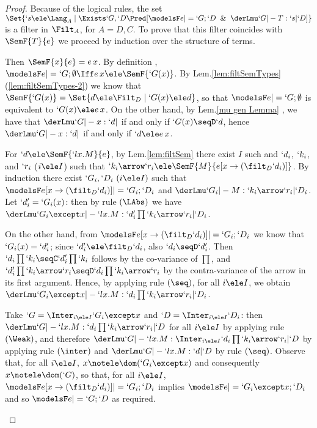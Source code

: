 \documentclass{lmcs}
\begin{document}
 \begin{proof} Because of the logical rules, the set $ \Set{`s \ele \Lang_A \mid \Exists`G,`D \Pred [ \modelsF e |= `G;`D \And \derLmu `G |- T : `s | `D ] }$ is a filter in $\Filt_A$, for $A=D,C$. 
To prove that this filter coincides with $ \SemF { T}{ e }$ we proceed by induction over the structure of terms.

 \begin{description} \itemsep 2pt

 \item [$ T\equiv x $] 
Then $ \SemF { x}{ e } = e\,x$.
By definition%
, $\modelsF e |= `G;\emptyset \Iff e\,x \ele \SemF {`G(x)}$. 
By Lem.\skp\ref{lem:filtSemTypes}\,(\ref{lem:filtSemTypes-2}) we know that $ \SemF {`G(x)} = \Set{d\ele \Filt_D \mid `G(x)\ele d}$, so that $\modelsF e |= `G;\emptyset$ is equivalent to $`G(x)\ele e\,x$.
On the other hand, by Lem.\skp\ref{mu gen Lemma}%
, we have that $\derLmu `G |- x : `d | {} $ if and only if $`G(x)\seqD `d$, hence $\derLmu `G |- x : `d | {} $ if and only if $`d\ele e\,x$.
	
 \item [$ T\equiv `l x.M $] 
For $`d \ele \SemF { `l x.M}{ e }$, by Lem.\skp\ref{lem:filtSem} %
there exist $I$ such and $`d_i$, $`k_i$, and $`r_i$ ($i \ele I$) such that $`k_i\arrow `r_i \ele \SemF { M }{ e[x\to (\filt_D `d_i)] }$. 
By induction there exist $`G_i,`D _i ~ (i \ele I)$ such that $ \modelsF e[x\to (\filt_D `d_i)] |= `G_i;`D_i $ and $\derLmu `G_i |- M : `k_i\arrow `r_i | `D_i $. 
Let $`d'_i = `G_i(x)$: then by rule $(\LAbs)$ we have $\derLmu `G_i\except x |- `l x.M : `d'_i\prod `k_i\arrow `r_i | `D_i $. 

On the other hand, from $ \modelsF e[x\to (\filt_D `d_i)] |= `G_i;`D_i $ we know that $`G_i(x) = `d'_i $; since $`d'_i \ele \filt_D `d_i$, also $`d_i\seqD `d'_i$.
Then $`d_i\prod `k_i\seqC `d_i'\prod `k_i$ follows by the co-variance of $\prod $, and 
$`d'_i\prod `k_i\arrow `r_i \seqD `d_i\prod `k_i\arrow `r_i$ by the contra-variance of the arrow in its first argument. 
Hence, by applying rule $(\seq)$, for all $i \ele I$, we obtain $ \derLmu `G_i\except x |- `l x.M : `d_i\prod `k_i\arrow `r_i | `D_i $. 

Take $`G = \Inter_{i \ele I}`G_i\except x$ and $`D = \Inter_{i \ele I}`D_i$: then $ \derLmu `G |- `l x.M : `d_i\prod `k_i\arrow `r_i | `D $ for all $i \ele I$ by applying rule $(\Weak)$, and therefore $ \derLmu `G |- `l x.M : \Inter_{i \ele I}`d_i\prod `k_i\arrow `r_i | `D $ by applying rule $(\inter)$ and $ \derLmu `G |- `l x.M : `d | `D $ by rule $(\seq)$. 
Observe that, for all $i \ele I$, $x\notele \dom(`G_i\except x)$ and consequently $x\notele \dom(`G)$, so that, for all $i \ele I$, $ \modelsF e[x\to (\filt_D `d_i)] |= `G_i;`D_i $ implies $ \modelsF e |= `G_i\except x;`D_i $ and so $ \modelsF e |= `G;`D $ as required.
	

\end{description}
\end{proof}
\end{document}
